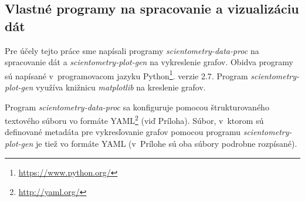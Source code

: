 \subsection{Vlastné programy na spracovanie a vizualizáciu dát}
\label{sec:program.my}

Pre účely tejto práce sme napísali programy \emph{scientometry-data-proc} na
spracovanie dát a \emph{scientometry-plot-gen} na vykreslenie grafov.  Obidva
programy sú napísané v~programovacom jazyku
Python\footnote{\url{https://www.python.org/}}. verzie 2.7.
Program \emph{scientometry-plot-gen} využíva knižnicu \emph{matplotlib} na kreslenie
grafov.

Program \emph{scientometry-data-proc} sa konfiguruje pomocou štrukturovaného
textového súboru vo formáte YAML\footnote{\url{http://yaml.org/}} (viď
Príloha). Súbor, v~ktorom sú definované metadáta pre vykresľovanie grafov
pomocou programu \emph{scientometry-plot-gen} je tiež vo formáte YAML
(v~Prílohe sú oba súbory podrobne rozpísané).


